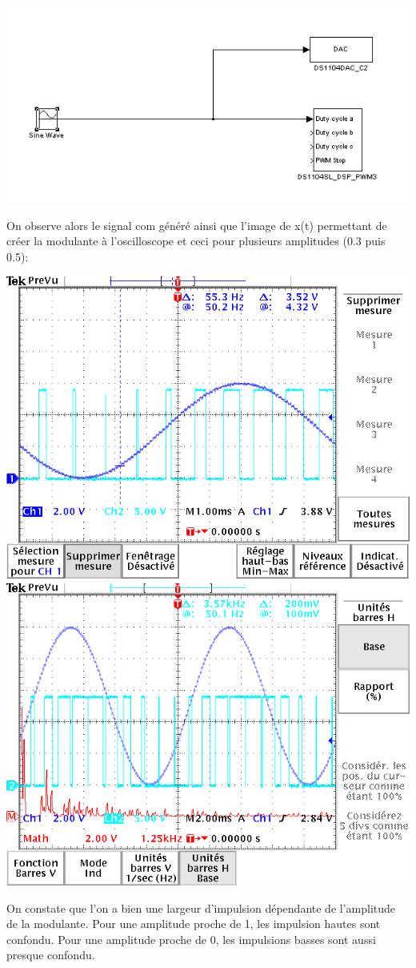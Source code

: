 \documentclass[10pt,a4paper]{article}
\begin{document}
\begin{center}
\includegraphics[scale=0.4]{simulink.png}
\end{center}
	\bigbreak
	
	On observe alors le signal com généré ainsi que l'image de x(t) permettant de créer la modulante à l'oscilloscope et ceci pour plusieurs amplitudes (0.3 puis 0.5):
	\begin{center}
	\includegraphics[scale=0.3]{amp03f100.png}
	\includegraphics[scale=0.3]{amp05f100.png}
	\end{center}
	On constate que l'on a bien une largeur d'impulsion dépendante de l'amplitude de la modulante. Pour une amplitude proche de 1, les impulsion hautes sont confondu. Pour une amplitude proche de 0, les impulsions basses sont aussi presque confondu.\\
	
\end{document}
